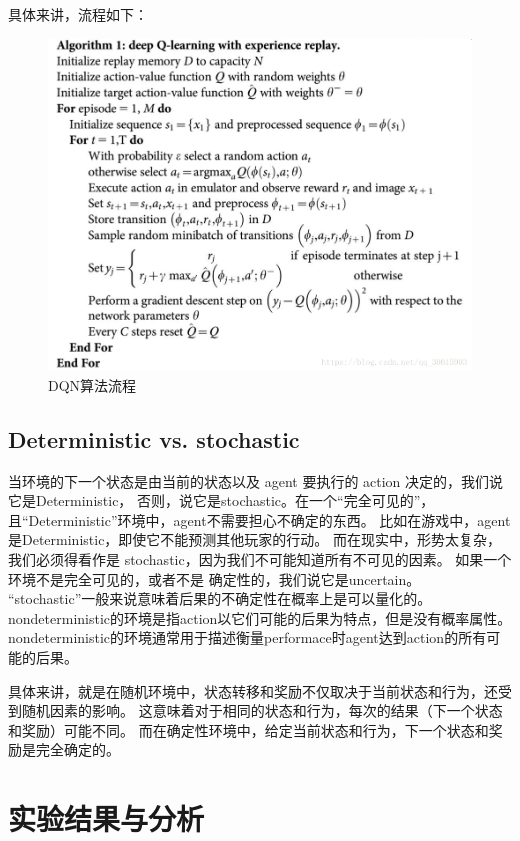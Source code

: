 \documentclass{thuemp}
\begin{document}
具体来讲，流程如下：
\begin{figure}[H]
  \centering
  \includegraphics[width=1\linewidth]{./img/dqn.png}
  \caption{DQN算法流程}
\end{figure}

\subsection{Deterministic vs. stochastic}
当环境的下一个状态是由当前的状态以及 agent 要执行的 action 决定的，我们说它是Deterministic，
否则，说它是stochastic。在一个“完全可见的”，且“Deterministic”环境中，agent不需要担心不确定的东西。
比如在游戏中，agent是Deterministic，即使它不能预测其他玩家的行动。
而在现实中，形势太复杂，我们必须得看作是 stochastic，因为我们不可能知道所有不可见的因素。
如果一个环境不是完全可见的，或者不是 确定性的，我们说它是uncertain。
“stochastic”一般来说意味着后果的不确定性在概率上是可以量化的。
nondeterministic的环境是指action以它们可能的后果为特点，但是没有概率属性。
nondeterministic的环境通常用于描述衡量performace时agent达到action的所有可能的后果。

具体来讲，就是在随机环境中，状态转移和奖励不仅取决于当前状态和行为，还受到随机因素的影响。
这意味着对于相同的状态和行为，每次的结果（下一个状态和奖励）可能不同。
而在确定性环境中，给定当前状态和行为，下一个状态和奖励是完全确定的。\\
\vbox{}

\section{实验结果与分析}
\end{document}
